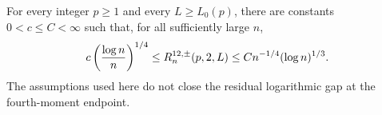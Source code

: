 For every integer \(p\geq1\) and every \(L\geq L_0(p)\), there are constants \(0<c\leq C<\infty\) such that, for all sufficiently large \(n\),
\[
 c\left({\log n\over n}\right)^{1/4}
 \leq R^{12,\pm}_n(p,2,L)
 \leq C n^{-1/4}(\log n)^{1/3}.
\]
The assumptions used here do not close the residual logarithmic gap at the fourth-moment endpoint.